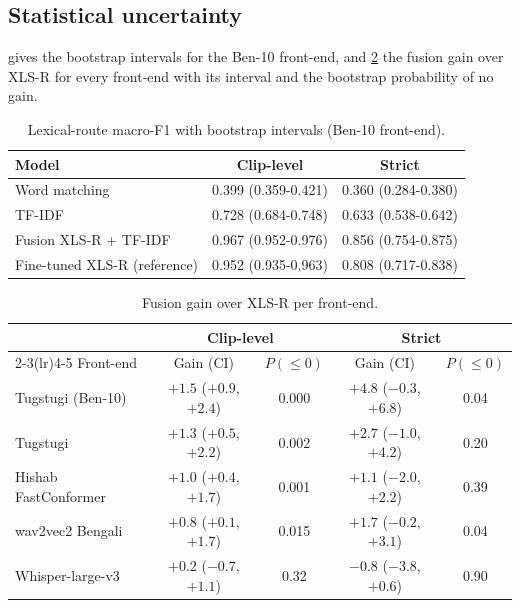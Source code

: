 \subsection{Statistical uncertainty}

 gives the bootstrap intervals for the Ben-10 front-end,
and \cref{tab:fusion-gains} the fusion gain over XLS-R for every front-end
with its interval and the bootstrap probability of no gain.

\begin{table}[ht]
  \centering
  \caption{Lexical-route macro-F1 with bootstrap intervals (Ben-10 front-end).}
  \label{tab:ci-lexical}
  \begin{tabular}{lcc}
    \toprule
    Model & Clip-level & Strict \\
    \midrule
    Word matching          & 0.399 (0.359-0.421) & 0.360 (0.284-0.380) \\
    TF-IDF                 & 0.728 (0.684-0.748) & 0.633 (0.538-0.642) \\
    Fusion XLS-R + TF-IDF  & 0.967 (0.952-0.976) & 0.856 (0.754-0.875) \\
    Fine-tuned XLS-R (reference) & 0.952 (0.935-0.963) & 0.808 (0.717-0.838) \\
    \bottomrule
  \end{tabular}
\end{table}

\begin{table}[ht]
  \centering
  \caption{Fusion gain over XLS-R per front-end.}
  \label{tab:fusion-gains}
  \small
  \begin{tabular}{lcccc}
    \toprule
    & \multicolumn{2}{c}{Clip-level} & \multicolumn{2}{c}{Strict} \\
    \cmidrule(lr){2-3}\cmidrule(lr){4-5}
    Front-end & Gain (CI) & $P(\le 0)$ & Gain (CI) & $P(\le 0)$ \\
    \midrule
    Tugstugi (Ben-10)    & $+1.5$ ($+0.9$, $+2.4$) & 0.000 & $+4.8$ ($-0.3$, $+6.8$) & 0.04 \\
    Tugstugi             & $+1.3$ ($+0.5$, $+2.2$) & 0.002 & $+2.7$ ($-1.0$, $+4.2$) & 0.20 \\
    Hishab FastConformer & $+1.0$ ($+0.4$, $+1.7$) & 0.001 & $+1.1$ ($-2.0$, $+2.2$) & 0.39 \\
    wav2vec2 Bengali     & $+0.8$ ($+0.1$, $+1.7$) & 0.015 & $+1.7$ ($-0.2$, $+3.1$) & 0.04 \\
    Whisper-large-v3     & $+0.2$ ($-0.7$, $+1.1$) & 0.32  & $-0.8$ ($-3.8$, $+0.6$) & 0.90 \\
    \bottomrule
  \end{tabular}
\end{table}

